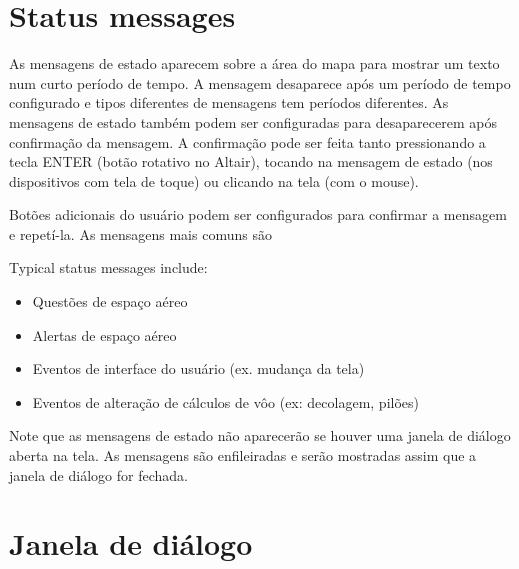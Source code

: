 \section{Status messages}

As mensagens de estado aparecem sobre a área do mapa para mostrar um texto num curto período de tempo.  A mensagem desaparece após um período de tempo configurado e tipos diferentes de mensagens tem períodos diferentes.  As mensagens de estado também podem ser configuradas para desaparecerem após confirmação da mensagem.  A confirmação pode ser feita tanto pressionando a tecla ENTER (botão rotativo no Altair), tocando na mensagem de estado (nos dispositivos com tela de toque) ou clicando na tela (com o mouse).

Botões adicionais do usuário podem ser configurados para confirmar a mensagem e repetí-la.
As mensagens mais comuns são


Typical status messages include:
\begin{itemize}
\item Questões de espaço aéreo
\item Alertas de espaço aéreo
\item Eventos de interface do usuário (ex. mudança da tela)
\item Eventos de alteração de cálculos de vôo (ex: decolagem, pilões)
\end{itemize}

Note que as mensagens de estado não aparecerão se houver uma janela de diálogo aberta na tela.  As mensagens são enfileiradas e serão mostradas assim que a janela de diálogo for fechada.  


\section{Janela de diálogo}\label{sec:dialog-windows}

